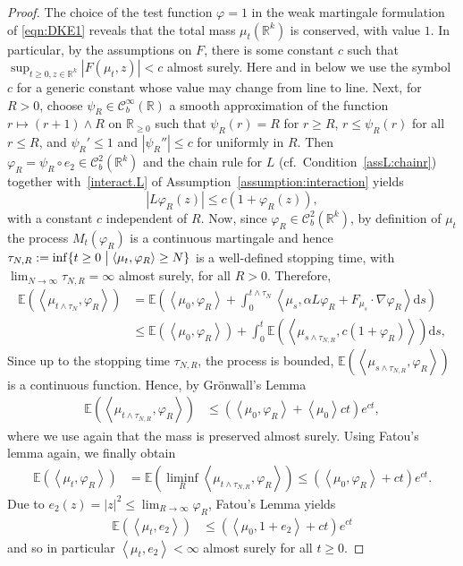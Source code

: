 \documentclass{article}
\newcommand{\dd}{\text{d}}
\newcommand{\av}[1]{\left<#1\right>}
\newcommand{\R}{\mathbb{R}}
\newcommand{\E}{\mathbb{E}}
\newcommand{\C}{\mathcal C}
\begin{document}
\begin{proof} The choice of the test function $\varphi =1$ in the weak martingale formulation of
  \eqref{eqn:DKE1} reveals that the total mass $\mu_t(\R^k)$ is conserved, with value $1$. In particular, by
  the assumptions on $F$, there is some constant $c$ such that $\sup_{t\geq 0, z \in \R^k} |F(\mu_t,z)| <c$
  almost surely. Here and in below we use the symbol $c$ for a generic constant whose value may change from
  line to line. Next, for $R > 0$, choose $\psi_R \in \C^\infty_b(\R)$ a smooth approximation of the function
  $ r \mapsto (r+1) \wedge R$ on $\R_{\geq 0}$ such that $\psi_R(r) = R$ for $r \geq R$, $r \leq \psi_R(r)$
  for all $r \leq R$, and $ \psi_R' \leq 1$ and $ |\psi_R''| \leq c $ for uniformly in $R$.  Then
  $\varphi_R = \psi_R \circ e_2 \in \C^2_b(\R^k)$ and the chain rule for $L$ (cf.\
  Condition~\ref{assL:chainr}) together with~\ref{interact.L} of Assumption~\ref{assumption:interaction}
  yields
  \begin{equation*}|L \varphi_R(z)| \leq c \left(1 +\varphi_R(z)\right),\end{equation*}
  with a constant $c$ independent of $R$. 
  Now, since $\varphi_R \in \C^2_b(\R^k)$, by definition of $\mu_t$ the process $M_t(\varphi_R)$ is a
  continuous martingale and hence $\tau_{N,R} := \inf\{t \geq 0 \bigm|\av{\mu_t, \varphi_R}\geq N\}$ is a
  well-defined stopping time, with $\lim_{N \to \infty}\tau_{N,R} = \infty$ almost surely, for all $R >
  0$. Therefore,
 \begin{align*}
                \E\left( \av{\mu_{t\wedge\tau_N}, \varphi_R} \right) &= \E\left(\av{\mu_0, \varphi_R} + \int_0^{t\wedge\tau_N} \av{\mu_s, \alpha L\varphi_R+F_{\mu_s} \cdot \nabla \varphi_R}\dd s\right)\\
                &\leq \E\left( \av{\mu_0, \varphi_R} \right) + \int_0^t \E\left( \av{\mu_{s\wedge \tau_{N,R}}, c\left(1+ \varphi_R\right)} \right)\dd s,
\end{align*}
Since up to the stopping time $\tau_{N,R}$, the process is bounded,
$\E\left( \av{\mu_{s\wedge \tau_{N,R}},\varphi_R} \right)$ is a continuous function. Hence, by Gr\"onwall's
Lemma
\begin{align*}
  \E\left( \av{\mu_{t \wedge \tau_{N,R}}, \varphi_R} \right) &\leq \left( \av{\mu_0, \varphi_R} + \av{\mu_0}ct\right)e^{ct},
\end{align*}
where we use again that the mass is preserved almost surely.  Using Fatou's lemma again, we finally
obtain
\begin{align*}
  \E\left( \av{\mu_{t},\varphi_R} \right) &= \E\left(\liminf_{R} \av{\mu_{t \wedge \tau_{N,R}},\varphi_R} \right)
                                            \leq \left( \av{\mu_0, \varphi_R} + ct\right)e^{ct}.
\end{align*}
{Due to $e_2(z) = |z|^2 \leq \lim_{R \to \infty}\varphi_R$,  Fatou's Lemma yields}
\begin{align}
  \label{est:secmombound}
  \E\left( \av{\mu_t, e_2} \right) &\leq \left( \av{\mu_0, 1+ e_2} + ct\right)e^{ct}
\end{align} 
and so in particular $\av{\mu_t, e_2} < \infty$ almost surely for all $t \geq 0$.
\end{proof}
\end{document}
